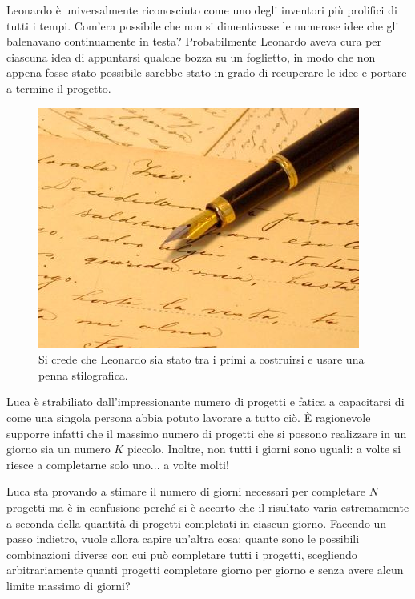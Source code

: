 \usepackage{xcolor}
\usepackage{afterpage}
\usepackage{pifont,mdframed}
\usepackage[bottom]{footmisc}

\makeatletter
\gdef\this@inputfilename{input}
\gdef\this@outputfilename{output}
\makeatother

\newcommand{\funcitem}[2]{\item[$\blacksquare$] \textbf{\large \textsf{Funzione} \texttt{#1}} \vspace{-0.3cm} \begin{center}\begin{tabularx}{\textwidth}{|c|X|} \hline #2 \hline \end{tabularx}\end{center}}

Leonardo è universalmente riconosciuto come uno degli inventori più prolifici di tutti i tempi. Com'era possibile che non si dimenticasse le numerose idee che gli balenavano continuamente in testa? Probabilmente Leonardo aveva cura per ciascuna idea di appuntarsi qualche bozza su un foglietto, in modo che non appena fosse stato possibile sarebbe stato in grado di recuperare le idee e portare a termine il progetto.

\begin{figure}[H]
  \begin{center}
        \includegraphics[width=0.5\linewidth]{progetti.jpg}
        \caption{Si crede che Leonardo sia stato tra i primi a costruirsi e usare una penna stilografica.}
  \end{center}
\end{figure}

Luca è strabiliato dall'impressionante numero di progetti e fatica a capacitarsi di come una singola persona abbia potuto lavorare a tutto ciò. È ragionevole supporre infatti che il massimo numero di progetti che si possono realizzare in un giorno sia un numero $K$ piccolo. Inoltre, non tutti i giorni sono uguali: a volte si riesce a completarne solo uno... a volte molti!

Luca sta provando a stimare il numero di giorni necessari per completare $N$ progetti ma è in confusione perché si è accorto che il risultato varia estremamente a seconda della quantità di progetti completati in ciascun giorno. Facendo un passo indietro, vuole allora capire un'altra cosa: quante sono le possibili combinazioni diverse con cui può completare tutti i progetti, scegliendo arbitrariamente quanti progetti completare giorno per giorno e senza avere alcun limite massimo di giorni?

